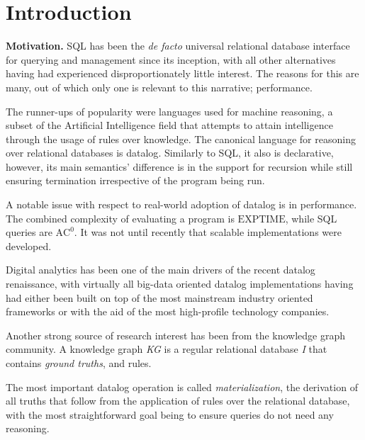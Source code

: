 \documentclass[manuscript,screen,review]{acmart}
\theoremstyle{definition}
\begin{document}

\maketitle

\section{Introduction}
\textbf{Motivation.} SQL\cite{key} has been the \textit{de facto} universal relational
database interface for querying and management since its inception,
with all other alternatives having had experienced disproportionately
little interest. The reasons for this are many, out of which only one
is relevant to this narrative; performance.

The runner-ups of popularity were languages used for machine reasoning,
a subset of the Artificial Intelligence field that attempts to attain
intelligence through the usage of rules over knowledge. The canonical
language for reasoning over relational databases is datalog\cite{datalog}.
Similarly to SQL, it also is declarative, however, its main semantics' difference
is in the support for recursion while still ensuring termination irrespective
of the program being run.

A notable issue with respect to real-world adoption of datalog is in
performance. The combined complexity of evaluating a program is
$\text{EXPTIME}$\cite{datalog}, while SQL queries are $\text{AC}^0$. It was
not until recently\cite{rdfox} that scalable implementations were
developed.

Digital analytics has been one of the main drivers of the recent datalog renaissance,
with virtually all big-data oriented datalog implementations having had either been built
on top of the most mainstream industry oriented frameworks\cite{bigdatalog,cog,cog2} or with the
aid of the most high-profile technology companies\cite{logica,yedalog,vadalog}.

Another strong source of research interest has been from the knowledge graph community. A
knowledge graph \textit{KG} is a regular relational database \textit{I} that contains
\textit{ground truths}, and rules.

The most important datalog operation is called \textit{materialization}, the derivation of all
truths that follow from the application of rules over the relational database, with the most
straightforward goal being to ensure queries do not need any reasoning.
\end{document}
